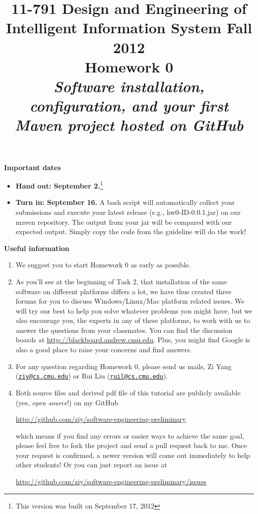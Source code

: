 \documentclass[oneside]{memoir}
\title{{\bfseries 11-791 Design and Engineering of Intelligent Information System Fall 2012\\Homework 0}\\
\vspace{1em}
\itshape\rmfamily Software installation, configuration, and your first Maven project hosted on GitHub}
\date{}
\begin{document}
\begin{titlingpage}
\maketitle

\hspace{-0.1\textwidth}
\begin{minipage}{1.2\textwidth}
\vspace{-5em}
\textbf{Important dates}
\begin{itemize}
\item \textbf{Hand out: September 2.}\footnote{This version was built on September 17, 2012}
\item \textbf{Turn in: September 16.} A bash script will automatically collect your submissions and execute your latest release (e.g., hw0-ID-0.0.1.jar) on our maven repository. The output from your jar will be compared with our expected output. Simply copy the code from the guideline will do the work!
\end{itemize}

\textbf{Useful information}
\begin{enumerate}
\item We suggest you to start Homework 0 as early as possible.
\item As you'll see at the beginning of Task 2, that installation of the same software on different platforms differs a lot, we have thus created three forums for you to discuss Windows/Linux/Mac platform related issues. We will try our best to help you solve whatever problems you might have, but we also encourage you, the experts in any of these platforms, to work with us to answer the questions from your classmates. You can find the discussion boards at \url{http://blackboard.andrew.cmu.edu}. Plus, you might find Google is also a good place to raise your concerns and find answers.
\item For any question regarding Homework 0, please send us mails, Zi Yang (\href{mailto:ziy@cs.cmu.edu}{\nolinkurl{ziy@cs.cmu.edu}}) or Rui Liu (\href{mailto:ruil@cs.cmu.edu}{\nolinkurl{ruil@cs.cmu.edu}}).
\item Both source files and derived pdf file of this tutorial are publicly available (yes, \emph{open source}!) on my GitHub

\url{http://github.com/ziy/software-engineering-preliminary}

which means if you find any errors or easier ways to achieve the same goal, please feel free to fork the project and send a pull request back to me. Once your request is confirmed, a newer version will come out immediately to help other students! Or you can just report an issue at

\url{http://github.com/ziy/software-engineering-preliminary/issues}

\end{enumerate}

\end{minipage}
\hspace{-0.1\textwidth}
\end{titlingpage}






\end{document}
